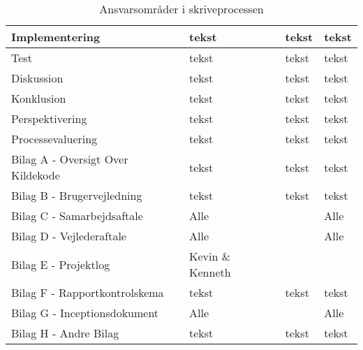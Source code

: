 \begin{table}[H]
\begin{tabularx}{\textwidth}{|p{7cm}|X|X|X|}
        \hline
        Implementering                      & tekst & tekst & tekst \\
        \hline
        Test                                & tekst & tekst & tekst \\
        \hline
        Diskussion                          & tekst & tekst & tekst \\
        \hline
        Konklusion                          & tekst & tekst & tekst \\
        \hline
        Perspektivering                     & tekst & tekst & tekst \\
        \hline
        Processevaluering                   & tekst & tekst & tekst \\
        \hline
        Bilag A - Oversigt Over Kildekode   & tekst & tekst & tekst \\
        \hline
        Bilag B - Brugervejledning          & tekst & tekst & tekst\\
        \hline
        Bilag C - Samarbejdsaftale          & Alle &  & Alle\\
        \hline
        Bilag D - Vejlederaftale            & Alle &  & Alle\\
        \hline
        Bilag E - Projektlog                & Kevin \& Kenneth &  & \\
        \hline
        Bilag F - Rapportkontrolskema       & tekst & tekst & tekst\\
        \hline
        Bilag G - Inceptionsdokument        & Alle &  & Alle \\
        \hline
        Bilag H - Andre Bilag & tekst       & tekst & tekst \\
        \hline
    \end{tabularx}
    \caption{Ansvarsområder i skriveprocessen}
    \label{tab:redaktionelt}
\end{table}